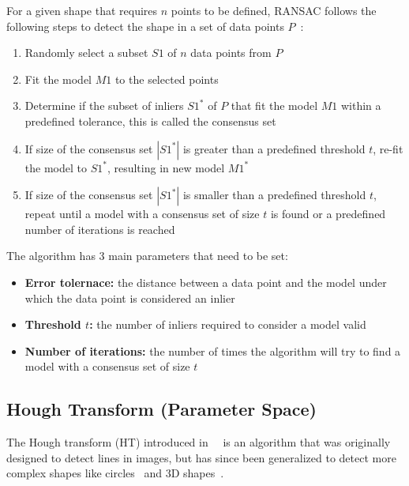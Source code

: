 For a given shape that requires $n$ points to be defined, RANSAC follows the following steps to detect the shape
in a set of data points $P$~\parencite{fischler_random_1981}:
\begin{enumerate}
    \item Randomly select a subset $S1$ of $n$ data points from $P$
    \item Fit the model $M1$ to the selected points
    \item Determine if the subset of inliers $S1^*$ of $P$ that fit the model $M1$ within a predefined tolerance, this is called the consensus set
    \item If size of the consensus set $|S1^*|$ is greater than a predefined threshold $t$, re-fit the model to $S1^*$, resulting in new model $M1^*$
    \item If size of the consensus set $|S1^*|$ is smaller than a predefined threshold $t$, repeat until a model with a consensus set of size $t$ is found or a predefined number of iterations is reached
\end{enumerate}

The algorithm has 3 main parameters that need to be set:
\begin{itemize}
    \item \textbf{Error tolernace:} the distance between a data point and the model under which the data point is considered an inlier
    \item \textbf{Threshold $t$:} the number of inliers required to consider a model valid
    \item \textbf{Number of iterations:} the number of times the algorithm will try to find a model with a consensus set of size $t$
\end{itemize}

\subsection{Hough Transform (Parameter Space)}
The Hough transform (HT) introduced in~\citeyear{hough_method_1962}~\parencite{hough_method_1962}
is an algorithm that was originally designed to detect lines in images,
but has since been generalized to detect more complex shapes like circles~\cite{ballard_generalizing_1981} and 3D shapes~\cite{woodford_demisting_2014}.

